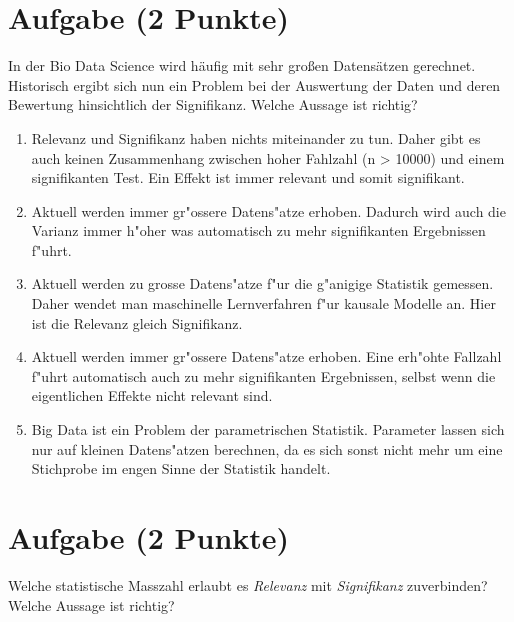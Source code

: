 \documentclass[a4paper, 10pt]{scrartcl}\usepackage[]{graphicx}\usepackage[]{xcolor}
\begin{document}
\section{Aufgabe \hfill (2 Punkte)}

In der Bio Data Science wird h{\"a}ufig mit sehr gro{\ss}en Datens{\"a}tzen
gerechnet. Historisch ergibt sich nun ein Problem bei der Auswertung der
Daten und deren Bewertung hinsichtlich der Signifikanz. Welche Aussage ist richtig?



\begin{enumerate}
\item [\textbf{A} \msquare] Relevanz und Signifikanz haben nichts miteinander zu tun. Daher gibt es auch keinen Zusammenhang zwischen hoher Fahlzahl (n > 10000) und einem signifikanten Test. Ein Effekt ist immer relevant und somit signifikant.
\item [\textbf{B} \msquare] Aktuell werden immer gr{"o}ssere Datens{"a}tze erhoben. Dadurch wird auch die Varianz immer h{"o}her was automatisch zu mehr signifikanten Ergebnissen f{"u}hrt.
\item [\textbf{C} \msquare] Aktuell werden zu grosse Datens{"a}tze f{"u}r die g{"a}nigige Statistik gemessen. Daher wendet man maschinelle Lernverfahren f{"u}r kausale Modelle an. Hier ist die Relevanz gleich Signifikanz.
\item [\textbf{D} \msquare] Aktuell werden immer gr{"o}ssere Datens{"a}tze erhoben. Eine erh{"o}hte Fallzahl f{"u}hrt automatisch auch zu mehr signifikanten Ergebnissen, selbst wenn die eigentlichen Effekte nicht relevant sind.
\item [\textbf{E} \msquare] Big Data ist ein Problem der parametrischen Statistik. Parameter lassen sich nur auf kleinen Datens{"a}tzen berechnen, da es sich sonst nicht mehr um eine Stichprobe im engen Sinne der Statistik handelt.
\end{enumerate}

\section{Aufgabe \hfill (2 Punkte)}

Welche statistische Masszahl erlaubt es \textit{Relevanz} mit
\textit{Signifikanz} zuverbinden? Welche Aussage ist richtig?
\end{document}
